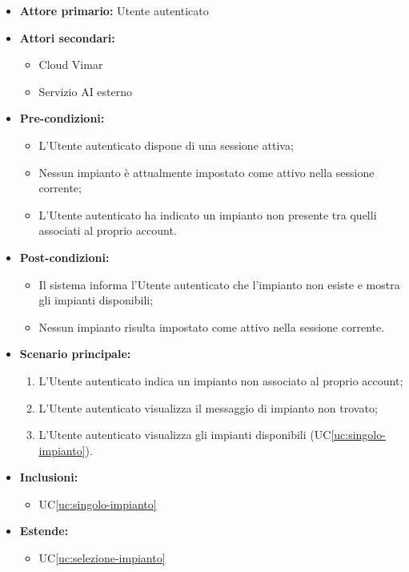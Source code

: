 \documentclass[11pt, a4paper]{article}
\newcounter{uc}                            %
\newcommand{\ucref}[1]{UC\ref{uc:#1}}
\begin{document}
\begin{itemize}[label=\textbullet]
  \item \textbf{Attore primario:} Utente autenticato
  \item \textbf{Attori secondari:}
  \begin{itemize}[label=‣]
    \item Cloud Vimar
    \item Servizio AI esterno
  \end{itemize}
  \item \textbf{Pre-condizioni:}
  \begin{itemize}[label=‣]
    \item L'Utente autenticato dispone di una sessione attiva;
    \item Nessun impianto è attualmente impostato come attivo nella sessione corrente;
    \item L'Utente autenticato ha indicato un impianto non presente tra quelli associati al proprio account.
  \end{itemize}
  \item \textbf{Post-condizioni:}
  \begin{itemize}[label=‣]
    \item Il sistema informa l'Utente autenticato che l'impianto non esiste e mostra gli impianti disponibili;
    \item Nessun impianto risulta impostato come attivo nella sessione corrente.
  \end{itemize}
  \item \textbf{Scenario principale:}
  \begin{enumerate}
    \item L'Utente autenticato indica un impianto non associato al proprio account;
    \item L'Utente autenticato visualizza il messaggio di impianto non trovato;
    \item L'Utente autenticato visualizza gli impianti disponibili (\ucref{singolo-impianto}).
  \end{enumerate}
  \item \textbf{Inclusioni:}
  \begin{itemize}[label=‣]
    \item \ucref{singolo-impianto}
  \end{itemize}
  \item \textbf{Estende:}
  \begin{itemize}[label=‣]
    \item \ucref{selezione-impianto}
  \end{itemize}
  
\end{itemize}
\end{document}
